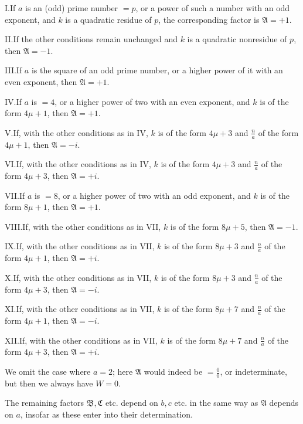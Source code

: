 I.\quad If $a$ is an (odd) prime number $=p$, or a power of such a number with an odd exponent, and $k$ is a quadratic residue of $p$, the corresponding factor is $\mathfrak A=+1$.

II.\quad If the other conditions remain unchanged and $k$ is a quadratic nonresidue of $p$, then $\mathfrak A=-1$.

III.\quad If $a$ is the square of an odd prime number, or a higher power of it with an even exponent, then $\mathfrak A=+1$.

IV.\quad If $a$ is $=4$, or a higher power of two with an even exponent, and $k$ is of the form $4\mu+1$, then $\mathfrak A=+1$.

V.\quad If, with the other conditions as in IV, $k$ is of the form $4\mu+3$ and $\frac{n}{a}$ of the form $4\mu+1$, then $\mathfrak A=-i$.

VI.\quad If, with the other conditions as in IV, $k$ is of the form $4\mu+3$ and $\frac{n}{a}$ of the form $4\mu+3$, then $\mathfrak A=+i$.

VII.\quad If $a$ is $=8$, or a higher power of two with an odd exponent, and $k$ is of the form $8\mu+1$, then $\mathfrak A=+1$.

VIII.\quad If, with the other conditions as in VII, $k$ is of the form $8\mu+5$, then $\mathfrak A=-1$.

IX.\quad If, with the other conditions as in VII, $k$ is of the form $8\mu+3$ and $\frac{n}{a}$ of the form $4\mu+1$, then $\mathfrak A=+i$.


X.\quad If, with the other conditions as in VII, $k$ is of the form $8\mu+3$ and $\frac{n}{a}$ of the form $4\mu+3$, then $\mathfrak A=-i$.

XI.\quad If, with the other conditions as in VII, $k$ is of the form $8\mu+7$ and $\frac{n}{a}$ of the form $4\mu+1$, then $\mathfrak A=-i$.

XII.\quad If, with the other conditions as in VII, $k$ is of the form $8\mu+7$ and $\frac{n}{a}$ of the form $4\mu+3$, then $\mathfrak A=+i$.

We omit the case where $a=2$; here $\mathfrak A$ would indeed be $=\frac00$, or indeterminate, but then we always have $W=0$.

The remaining factors $\mathfrak B,\mathfrak C$ etc. depend on $b,c$ etc. in the same way as $\mathfrak A$ depends on $a$, insofar as these enter into their determination.


